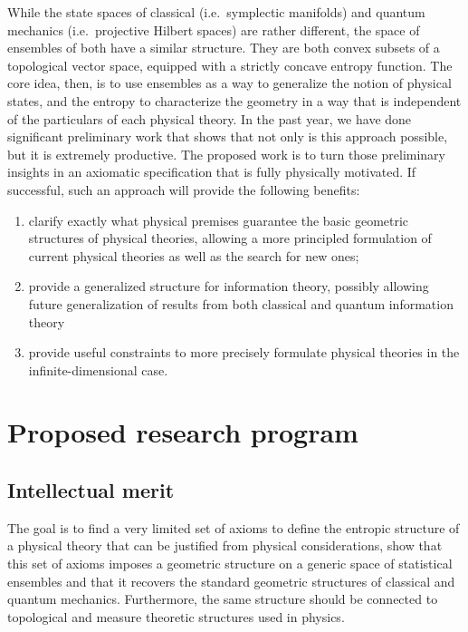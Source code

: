 While the state spaces of classical (i.e.~symplectic manifolds) and quantum mechanics (i.e.~projective Hilbert spaces) are rather different, the space of ensembles of both have a similar structure. They are both convex subsets of a topological vector space, equipped with a strictly concave entropy function. The core idea, then, is to use ensembles as a way to generalize the notion of physical states, and the entropy to characterize the geometry in a way that is independent of the particulars of each physical theory. In the past year, we have done significant preliminary work that shows that not only is this approach possible, but it is extremely productive. The proposed work is to turn those preliminary insights in an axiomatic specification that is fully physically motivated. If successful, such an approach will provide the following benefits:
\begin{enumerate}
	\item clarify exactly what physical premises guarantee the basic geometric structures of physical theories, allowing a more principled formulation of current physical theories as well as the search for new ones;
	\item provide a generalized structure for information theory, possibly allowing future generalization of results from both classical and quantum information theory
	\item provide useful constraints to more precisely formulate physical theories in the infinite-dimensional case.
\end{enumerate}

\section{Proposed research program}
\subsection{Intellectual merit}

The goal is to find a very limited set of axioms to define the entropic structure of a physical theory that can be justified from physical considerations, show that this set of axioms imposes a geometric structure on a generic space of statistical ensembles and that it recovers the standard geometric structures of classical and quantum mechanics. Furthermore, the same structure should be connected to topological and measure theoretic structures used in physics.

 
